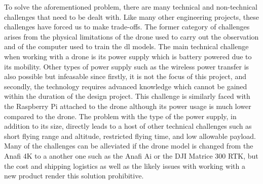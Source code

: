 \documentclass[../main.tex]{subfiles}
\begin{document}
To solve the aforementioned problem, 
there are many technical and non-technical challenges
that need to be dealt with.
Like many other engineering projects,
these challenges have forced us to make trade-offs.
The former category of challenges arises 
from the physical limitations of the drone used to
carry out the observation
and of the computer used to train the \gls{dl} models.
The main technical challenge when working with a drone
is its power supply which is battery powered due to its mobility. 
Other types of power supply such as the wireless power transfer
is also possible but infeasable since firstly, it is not the
focus of this project, and secondly, the technology requires 
advanced knowledge which cannot be gained within the duration 
of the design project.
This challenge is similarly faced with the Raspberry Pi attached
to the drone although its power usage is much lower compared to the drone.
The problem with the type of the power supply, in addition to its size, 
directly leads to a host of other technical challenges
such as short flying range and altitude, restricted flying time,
and low allowable payload.
Many of the challenges can be alleviated if the drone model is changed
from the Anafi 4K to a another one such as 
the Anafi Ai or the DJI Matrice 300 RTK,
but the cost and shipping logistics as well as
the likely issues with working with a new product
render this solution prohibitive.
\end{document}
